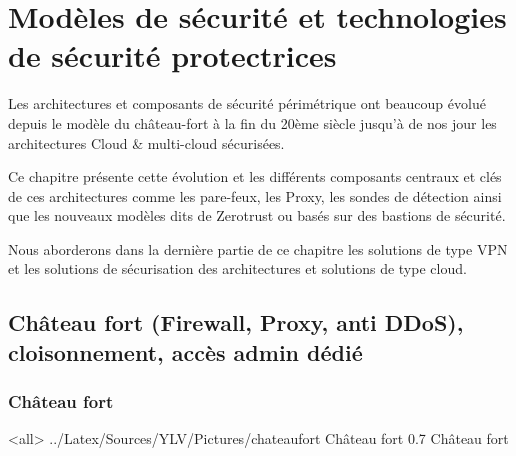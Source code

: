 \section{Modèles de sécurité et technologies de sécurité protectrices}

Les architectures et composants de sécurité périmétrique ont beaucoup évolué depuis le modèle du château-fort à la fin du 20ème siècle jusqu'à de nos jour les architectures Cloud \& multi-cloud sécurisées.

Ce chapitre présente cette évolution et les différents composants centraux et clés de ces architectures comme les pare-feux, les Proxy, les sondes de détection ainsi que les nouveaux modèles dits de Zerotrust ou basés sur des bastions de sécurité.

Nous aborderons dans la dernière partie de ce chapitre les solutions de type VPN et les solutions de sécurisation des architectures et solutions de type cloud.

\subsection{Château fort (Firewall, Proxy, anti DDoS), cloisonnement, accès admin dédié}
\subsubsection{Château fort}


\mode<all>{\picframe
{../Latex/Sources/YLV/Pictures/chateaufort}%
{Château fort} %
{0.7} %
{Château fort} %
}

